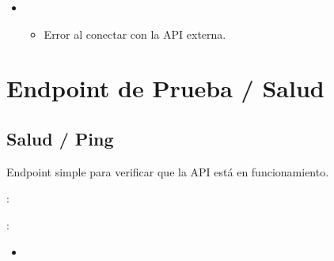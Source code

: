 \documentclass[letterpaper,10pt,spanish]{sphinxmanual}
\renewcommand{\sphinxbfcode}[1]{\textbf{\sphinxcode{#1}}}
\renewcommand{\sphinxupquote}[1]{\texttt{#1}}
\begin{document}
\begin{fulllineitems}
\begin{itemize}
\begin{sphinxVerbatim}[commandchars=\\\{\}]
\end{sphinxVerbatim}

\item {} 
\sphinxAtStartPar
{}
\begin{itemize}
\item {} 
\sphinxAtStartPar
Error al conectar con la API externa.

\end{itemize}

\end{itemize}

\end{fulllineitems}



\section{Endpoint de Prueba / Salud}
\label{\detokenize{endpoints:endpoint-de-prueba-salud}}

\subsection{Salud / Ping}
\label{\detokenize{endpoints:salud-ping}}

\begin{fulllineitems}
\label{\detokenize{endpoints:get--saludo}}
\pysigstartsignatures
\pysigline
{\sphinxbfcode{\sphinxupquote{GET~}}\sphinxbfcode{\sphinxupquote{/saludo}}}
\pysigstopsignatures
\sphinxAtStartPar
Endpoint simple para verificar que la API está en funcionamiento.

\sphinxAtStartPar
{}:

\begin{sphinxVerbatim}[commandchars=\\\{\}]
  
 
\end{sphinxVerbatim}

\sphinxAtStartPar
{}:
\begin{itemize}
\item {} 
\sphinxAtStartPar
{}

\begin{sphinxVerbatim}[commandchars=\\\{\}]
\end{sphinxVerbatim}

\end{itemize}

\end{fulllineitems}
\end{document}

